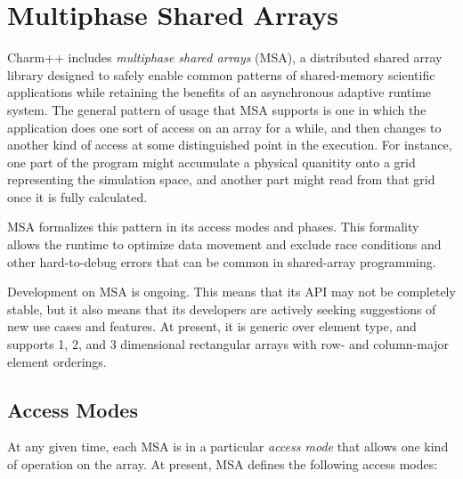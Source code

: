 \section{Multiphase Shared Arrays}
\label{msa}

Charm++ includes \emph{multiphase shared arrays} (MSA), a distributed
shared array library designed to safely enable common patterns of
shared-memory scientific applications while retaining the benefits of
an asynchronous adaptive runtime system. The general pattern of usage
that MSA supports is one in which the application does one sort of
access on an array for a while, and then changes to another kind of
access at some distinguished point in the execution. For instance, one
part of the program might accumulate a physical quanitity onto a grid
representing the simulation space, and another part might read from
that grid once it is fully calculated.

MSA formalizes this pattern in its access modes and phases. This
formality allows the runtime to optimize data movement and exclude
race conditions and other hard-to-debug errors that can be common in
shared-array programming.

Development on MSA is ongoing. This means that its API may not be
completely stable, but it also means that its developers are actively
seeking suggestions of new use cases and features. At present, it is
generic over element type, and supports 1, 2, and 3 dimensional
rectangular arrays with row- and column-major element orderings.

\subsection{Access Modes}

At any given time, each MSA is in a particular \emph{access mode} that
allows one kind of operation on the array. At present, MSA defines the
following access modes:

